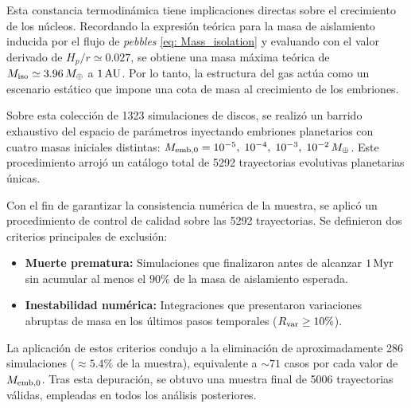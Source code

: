 Esta constancia termodinámica tiene implicaciones directas sobre el crecimiento de los núcleos. Recordando la expresión teórica para la masa de aislamiento inducida por el flujo de \textit{pebbles} \eqref{eq: Mass_isolation} y evaluando con el valor derivado de $H_p/r \simeq 0.027$, se obtiene una masa máxima teórica de $M_{\rm iso} \simeq 3.96\,M_\oplus$ a $1\,{\rm AU}$. Por lo tanto, la estructura del gas actúa como un escenario estático que impone una cota de masa al crecimiento de los embriones.


Sobre esta colección de 1323 simulaciones de discos, se realizó un barrido exhaustivo del espacio de parámetros inyectando embriones planetarios con cuatro masas iniciales distintas: $M_{\rm emb,0} = 10^{-5},\; 10^{-4},\; 10^{-3},\; 10^{-2}\,M_\oplus$. Este procedimiento arrojó un catálogo total de 5292 trayectorias evolutivas planetarias únicas.

Con el fin de garantizar la consistencia numérica de la muestra, se aplicó un procedimiento de control de calidad sobre las 5292 trayectorias. Se definieron dos criterios principales de exclusión:

\begin{itemize}
    \item \textbf{Muerte prematura:} Simulaciones que finalizaron antes de alcanzar $1\,{\rm Myr}$ sin acumular al menos el $90\%$ de la masa de aislamiento esperada.
    \item \textbf{Inestabilidad numérica:} Integraciones que presentaron variaciones abruptas de masa en los últimos pasos temporales ($R_{\rm var} \geq 10\%$).
\end{itemize}

La aplicación de estos criterios condujo a la eliminación de aproximadamente 286 simulaciones ($\approx 5.4\%$ de la muestra), equivalente a $\sim 71$ casos por cada valor de $M_{\rm emb,0}$. Tras esta depuración, se obtuvo una muestra final de 5006 trayectorias válidas, empleadas en todos los análisis posteriores.


